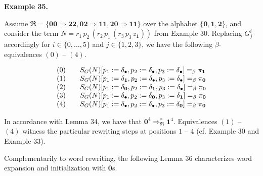  
 
\par\medskip\noindent\textbf{Example 35.}\par
 
 
Assume $\mathfrak{R}=\{\mathbf{0}\mathbf{0}\Rightarrow\mathbf{2}\mathbf{2},\mathbf{0}%
\mathbf{2}\Rightarrow\mathbf{1}\mathbf{1},\mathbf{2}\mathbf{0}\Rightarrow%
\mathbf{1}\mathbf{1}\}$ over the alphabet $\{\mathbf{0},\mathbf{1},\mathbf{2}\}$, and consider the term $N=r_{1}\,p_{2}\,(r_{2}\,p_{1}\,(r_{3}\,p_{3}\,z_{\mathbf{1}}))$ from Example 30. Replacing $G_{j}^{i}$ accordingly for $i\in\{0,\ldots,5\}$ and $j\in\{1,2,3\}$, we have the following $\beta$-equivalences $(0)$ – $(4)$.\par
    \[\begin{array}[]{lll}(0)&&S_{G}(N)[p_{1}:=\delta_{\bullet},p_{2}:=\delta_{%
\bullet},p_{3}:=\delta_{\bullet}]=_{\beta}\pi_{\mathbf{1}}\\
(1)&&S_{G}(N)[p_{1}:=\delta_{\mathbf{1}},p_{2}:=\delta_{\bullet},p_{3}:=\delta%
_{\bullet}]=_{\beta}\pi_{\mathbf{0}}\\
(2)&&S_{G}(N)[p_{1}:=\delta_{\mathbf{0}},p_{2}:=\delta_{\mathbf{1}},p_{3}:=%
\delta_{\bullet}]=_{\beta}\pi_{\mathbf{0}}\\
(3)&&S_{G}(N)[p_{1}:=\delta_{\bullet},p_{2}:=\delta_{\mathbf{0}},p_{3}:=\delta%
_{\mathbf{1}}]=_{\beta}\pi_{\mathbf{0}}\\
(4)&&S_{G}(N)[p_{1}:=\delta_{\bullet},p_{2}:=\delta_{\bullet},p_{3}:=\delta_{%
\mathbf{0}}]=_{\beta}\pi_{\mathbf{0}}\end{array}\]    
  
 
In accordance with Lemma 34, we have that $\mathbf{0}^{4}\Rightarrow_{\mathfrak{R}}^{*}\mathbf{1}^{4}$. Equivalences $(1)$ – $(4)$ witness the particular rewriting steps at positions $1$ – $4$ (cf. Example 30 and Example 33).\par
 
 
 
 
Complementarily to word rewriting, the following Lemma 36 characterizes word expansion and initialization with $\mathbf{0}$s.\par
 
